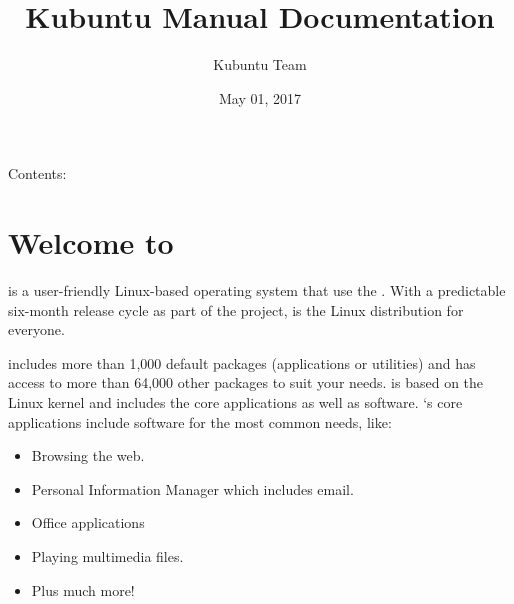 \documentclass[letterpaper,10pt,english]{sphinxmanual}
\title{Kubuntu Manual Documentation}
\date{May 01, 2017}
\author{Kubuntu Team}
\begin{document}
\maketitle
\sphinxtableofcontents
{}\label{\detokenize{index::doc}}


Contents:


\chapter{Welcome to }
\label{\detokenize{welcome:welcome-to-kubuntu}}\label{\detokenize{welcome::doc}}\label{\detokenize{welcome:welcome-to-kubuntu-s-documentation}}

 is a user-friendly Linux-based operating system that use the  . With a predictable
six-month release cycle as part of the  project,  is the Linux distribution for everyone.

 includes more than 1,000 default packages (applications or utilities) and has access to more than 64,000 other packages to suit your needs.  is based on the Linux kernel and includes the core  applications as well as  software. `s core applications include software for the most common needs, like:
\begin{itemize}
\item {} 
Browsing the web.

\item {} 
Personal Information Manager which includes email.

\item {} 
Office applications

\item {} 
Playing multimedia files.

\item {} 
Plus much more!

\end{itemize}
\end{document}
